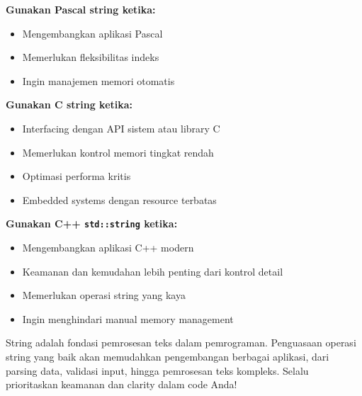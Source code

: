 \documentclass[../main.tex]{subfiles}
\begin{document}
\textbf{Gunakan Pascal string ketika:}
\begin{itemize}
  \item Mengembangkan aplikasi Pascal
  \item Memerlukan fleksibilitas indeks
  \item Ingin manajemen memori otomatis
\end{itemize}

\textbf{Gunakan C string ketika:}
\begin{itemize}
  \item Interfacing dengan API sistem atau library C
  \item Memerlukan kontrol memori tingkat rendah
  \item Optimasi performa kritis
  \item Embedded systems dengan resource terbatas
\end{itemize}

\textbf{Gunakan C++ \texttt{std::string} ketika:}
\begin{itemize}
  \item Mengembangkan aplikasi C++ modern
  \item Keamanan dan kemudahan lebih penting dari kontrol detail
  \item Memerlukan operasi string yang kaya
  \item Ingin menghindari manual memory management
\end{itemize}

String adalah fondasi pemrosesan teks dalam pemrograman. Penguasaan operasi string yang baik akan memudahkan pengembangan berbagai aplikasi, dari parsing data, validasi input, hingga pemrosesan teks kompleks. Selalu prioritaskan keamanan dan clarity dalam code Anda!
\end{document}
